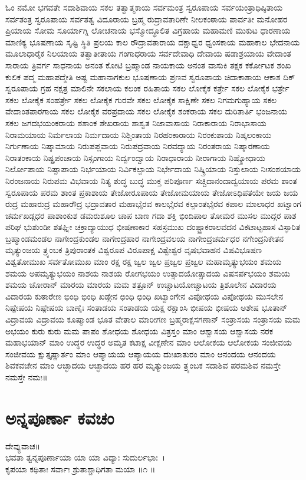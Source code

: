 ಓಂ ನಮೋ ಭಗವತೇ ಸದಾಶಿವಾಯ ಸಕಲ ತತ್ವಾತ್ಮಕಾಯ ಸರ್ವಮಂತ್ರ ಸ್ವರೂಪಾಯ ಸರ್ವಯಂತ್ರಾಧಿಷ್ಠಿತಾಯ ಸರ್ವತಂತ್ರ ಸ್ವರೂಪಾಯ ಸರ್ವತತ್ವ ವಿದೂರಾಯ ಬ್ರಹ್ಮ ರುದ್ರಾವತಾರಿಣೇ ನೀಲಕಂಠಾಯ ಪಾರ್ವತೀ ಮನೋಹರ ಪ್ರಿಯಾಯ ಸೋಮ ಸೂರ್ಯಾಗ್ನಿ ಲೋಚನಾಯ ಭಸ್ಮೋದ್ಧೂಲಿತ ವಿಗ್ರಹಾಯ ಮಹಾಮಣಿ ಮುಕುಟ ಧಾರಣಾಯ ಮಾಣಿಕ್ಯ ಭೂಷಣಾಯ ಸೃಷ್ಟಿ ಸ್ಥಿತಿ ಪ್ರಲಯ ಕಾಲ ರೌದ್ರಾವತಾರಾಯ ದಕ್ಷಾಧ್ವರ ಧ್ವಂಸಕಾಯ ಮಹಾಕಾಲ ಭೇದನಾಯ ಮೂಲಾಧಾರೈಕ ನಿಲಯಾಯ ತತ್ವಾತೀತಾಯ ಗಂಗಾಧರಾಯ ಸರ್ವದೇವಾಧಿ ದೇವಾಯ ಷಡಾಶ್ರಯಾಯ ವೇದಾಂತ ಸಾರಾಯ ತ್ರಿವರ್ಗ ಸಾಧನಾಯ ಅನಂತ ಕೋಟಿ ಬ್ರಹ್ಮಾಂಡ ನಾಯಕಾಯ ಅನಂತ ವಾಸುಕಿ ತಕ್ಷಕ ಕರ್ಕೋಟಕ ಶಂಖ ಕುಲಿಕ ಪದ್ಮ ಮಹಾಪದ್ಮೇತಿ ಅಷ್ಟ ಮಹಾನಾಗಕುಲ ಭೂಷಣಾಯ ಪ್ರಣವ ಸ್ವರೂಪಾಯ ಚಿದಾಕಾಶಾಯ ಆಕಾಶ ದಿಕ್ ಸ್ವರೂಪಾಯ ಗ್ರಹ ನಕ್ಷತ್ರ ಮಾಲಿನೇ ಸಕಲಾಯ ಕಲಂಕ ರಹಿತಾಯ ಸಕಲ ಲೋಕೈಕ ಕರ್ತ್ರೇ ಸಕಲ ಲೋಕೈಕ ಭರ್ತ್ರೇ ಸಕಲ ಲೋಕೈಕ ಸಂಹರ್ತ್ರೇ ಸಕಲ ಲೋಕೈಕ ಗುರವೇ ಸಕಲ ಲೋಕೈಕ ಸಾಕ್ಷಿಣೇ ಸಕಲ ನಿಗಮಗುಹ್ಯಾಯ ಸಕಲ ವೇದಾಂತಪಾರಗಾಯ ಸಕಲ ಲೋಕೈಕ ವರಪ್ರದಾಯ ಸಕಲ ಲೋಕೈಕ ಶಂಕರಾಯ ಸಕಲ ದುರಿತಾರ್ತಿ ಭಂಜನಾಯ ಸಕಲ ಜಗದಭಯಂಕರಾಯ ಶಶಾಂಕ ಶೇಖರಾಯ ಶಾಶ್ವತ ನಿಜಾವಾಸಾಯ ನಿರಾಕಾರಾಯ ನಿರಾಭಾಸಾಯ ನಿರಾಮಯಾಯ ನಿರ್ಮಲಾಯ ನಿರ್ಮದಾಯ ನಿಶ್ಚಿಂತಾಯ ನಿರಹಂಕಾರಾಯ ನಿರಂಕುಶಾಯ ನಿಷ್ಕಲಂಕಾಯ ನಿರ್ಗುಣಾಯ ನಿಷ್ಕಾಮಾಯ ನಿರುಪಪ್ಲವಾಯ ನಿರುಪದ್ರವಾಯ ನಿರವದ್ಯಾಯ ನಿರಂತರಾಯ ನಿಷ್ಕಾರಣಾಯ ನಿರಾತಂಕಾಯ ನಿಷ್ಪ್ರಪಂಚಾಯ ನಿಸ್ಸಂಗಾಯ ನಿರ್ದ್ವಂದ್ವಾಯ ನಿರಾಧಾರಾಯ ನೀರಾಗಾಯ ನಿಷ್ಕ್ರೋಧಾಯ ನಿರ್ಲೋಪಾಯ ನಿಷ್ಪಾಪಾಯ ನಿರ್ಭಯಾಯ ನಿರ್ವಿಕಲ್ಪಾಯ ನಿರ್ಭೇದಾಯ ನಿಷ್ಕ್ರಿಯಾಯ ನಿಸ್ತುಲಾಯ ನಿಃಸಂಶಯಾಯ ನಿರಂಜನಾಯ ನಿರುಪಮ ವಿಭವಾಯ ನಿತ್ಯ ಶುದ್ಧ ಬುದ್ಧ ಮುಕ್ತ ಪರಿಪೂರ್ಣ ಸಚ್ಚಿದಾನಂದಾದ್ವಯಾಯ ಪರಮ ಶಾಂತ ಸ್ವರೂಪಾಯ ಪರಮ ಶಾಂತ ಪ್ರಕಾಶಾಯ ತೇಜೋರೂಪಾಯ ತೇಜೋಮಯಾಯ ತೇಜೋಽಧಿಪತಯೇ ಜಯ ಜಯ ರುದ್ರ ಮಹಾರುದ್ರ ಮಹಾರೌದ್ರ ಭದ್ರಾವತಾರ ಮಹಾಭೈರವ ಕಾಲಭೈರವ ಕಲ್ಪಾಂತಭೈರವ ಕಪಾಲ ಮಾಲಾಧರ ಖಟ್ವಾಂಗ ಚರ್ಮಖಡ್ಗಧರ ಪಾಶಾಂಕುಶ ಡಮರುಶೂಲ ಚಾಪ ಬಾಣ ಗದಾ ಶಕ್ತಿ ಭಿಂದಿಪಾಲ ತೋಮರ ಮುಸಲ ಮುದ್ಗರ ಪಾಶ ಪರಿಘ ಭುಶುಂಡೀ ಶತಘ್ನೀ ಚಕ್ರಾದ್ಯಾಯುಧ ಭೀಷಣಾಕಾರ ಸಹಸ್ರಮುಖ ದಂಷ್ಟ್ರಾಕರಾಲವದನ ವಿಕಟಾಟ್ಟಹಾಸ ವಿಸ್ಫಾರಿತ ಬ್ರಹ್ಮಾಂಡಮಂಡಲ ನಾಗೇಂದ್ರಕುಂಡಲ ನಾಗೇಂದ್ರಹಾರ ನಾಗೇಂದ್ರವಲಯ ನಾಗೇಂದ್ರಚರ್ಮಧರ ನಗೇಂದ್ರನಿಕೇತನ ಮೃತ್ಯುಂಜಯ ತ್ರ್ಯಂಬಕ ತ್ರಿಪುರಾಂತಕ ವಿಶ್ವರೂಪ ವಿರೂಪಾಕ್ಷ ವಿಶ್ವೇಶ್ವರ ವೃಷಭವಾಹನ ವಿಷವಿಭೂಷಣ ವಿಶ್ವತೋಮುಖ ಸರ್ವತೋಮುಖ ಮಾಂ ರಕ್ಷ ರಕ್ಷ ಜ್ವಲ ಜ್ವಲ ಪ್ರಜ್ವಲ ಪ್ರಜ್ವಲ ಮಹಾಮೃತ್ಯುಭಯಂ ಶಮಯ ಶಮಯ ಅಪಮೃತ್ಯುಭಯಂ ನಾಶಯ ನಾಶಯ ರೋಗಭಯಂ ಉತ್ಸಾದಯೋತ್ಸಾದಯ ವಿಷಸರ್ಪಭಯಂ ಶಮಯ ಶಮಯ ಚೋರಾನ್ ಮಾರಯ ಮಾರಯ ಮಮ ಶತ್ರೂನ್ ಉಚ್ಚಾಟಯೋಚ್ಚಾಟಯ ತ್ರಿಶೂಲೇನ ವಿದಾರಯ ವಿದಾರಯ ಕುಠಾರೇಣ ಭಿಂಧಿ ಭಿಂಧಿ ಖಡ್ಗೇನ ಛಿಂಧಿ ಛಿಂಧಿ ಖಟ್ವಾಂಗೇನ ವಿಪೋಥಯ ವಿಪೋಥಯ ಮುಸಲೇನ ನಿಷ್ಪೇಷಯ ನಿಷ್ಪೇಷಯ ಬಾಣೈಃ ಸಂತಾಡಯ ಸಂತಾಡಯ ಯಕ್ಷ ರಕ್ಷಾಂಸಿ ಭೀಷಯ ಭೀಷಯ ಅಶೇಷ ಭೂತಾನ್ ವಿದ್ರಾವಯ ವಿದ್ರಾವಯ ಕೂಷ್ಮಾಂಡ ಭೂತ ವೇತಾಲ ಮಾರೀಗಣ ಬ್ರಹ್ಮರಾಕ್ಷಸಗಣಾನ್ ಸಂತ್ರಾಸಯ ಸಂತ್ರಾಸಯ ಮಮ ಅಭಯಂ ಕುರು ಕುರು ಮಮ ಪಾಪಂ ಶೋಧಯ ಶೋಧಯ ವಿತ್ರಸ್ತಂ ಮಾಂ ಆಶ್ವಾಸಯ ಆಶ್ವಾಸಯ ನರಕ ಮಹಾಭಯಾನ್ ಮಾಂ ಉದ್ಧರ ಉದ್ಧರ ಅಮೃತ ಕಟಾಕ್ಷ ವೀಕ್ಷಣೇನ ಮಾಂ ಆಲೋಕಯ ಆಲೋಕಯ ಸಂಜೀವಯ ಸಂಜೀವಯ ಕ್ಷುತ್ತೃಷ್ಣಾರ್ತಂ ಮಾಂ ಆಪ್ಯಾಯಯ ಆಪ್ಯಾಯಯ ದುಃಖಾತುರಂ ಮಾಂ ಆನಂದಯ ಆನಂದಯ ಶಿವಕವಚೇನ ಮಾಂ ಆಚ್ಛಾದಯ ಆಚ್ಛಾದಯ ಹರ ಹರ ಮೃತ್ಯುಂಜಯ ತ್ರ್ಯಂಬಕ ಸದಾಶಿವ ಪರಮಶಿವ ನಮಸ್ತೇ ನಮಸ್ತೇ ನಮಃ॥
\section{ಅನ್ನಪೂರ್ಣಾ ಕವಚಂ}
ದೇವ್ಯುವಾಚ॥\\
ಭವತಾ ತ್ವನ್ನಪೂರ್ಣಾಯಾ ಯಾ ಯಾ ವಿದ್ಯಾಃ ಸುದುರ್ಲಭಾಃ~।\\
ಕೃಪಯಾ ಕಥಿತಾಃ ಸರ್ವಾಃ ಶ್ರುತಾಶ್ಚಾಧಿಗತಾ ಮಯಾ ॥೧ ॥

